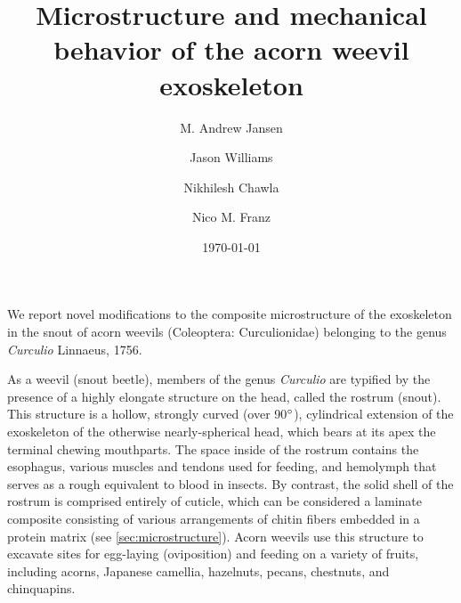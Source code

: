 \documentclass[twocolumn, linenumbers, superscriptaddress]{revtex4-1}
\begin{document}
	\begin{abstract}
		\blindtext
	\end{abstract}
	
	{\title{Microstructure and mechanical behavior of the acorn weevil exoskeleton}
	
	\date{\today}
	
	\author{M. Andrew Jansen}
	\author{Jason Williams}
	\author{Nikhilesh Chawla}
	\author{Nico M. Franz}
		
	\maketitle
	}
	


	We report novel modifications to the composite microstructure of the exoskeleton in the snout of acorn weevils (Coleoptera: Curculionidae) belonging to the genus \textit{Curculio} Linnaeus, 1756.

	As a weevil (snout beetle), members of the genus \textit{Curculio} are typified by the presence of a highly elongate structure on the head, called the rostrum (snout). 
	This structure is a hollow, strongly curved (over 90$\degree$), cylindrical extension of the exoskeleton of the otherwise nearly-spherical head, which bears at its apex the terminal chewing mouthparts. 
	The space inside of the rostrum contains the esophagus, various muscles and tendons used for feeding, and hemolymph that serves as a rough equivalent to blood in insects.
	By contrast, the solid shell of the rostrum is comprised entirely of cuticle, which can be considered a laminate composite consisting of various arrangements of chitin fibers embedded in a protein matrix (see \cref{sec:microstructure}).
	Acorn weevils use this structure to excavate sites for egg-laying (oviposition) and feeding on a variety of fruits, including acorns, Japanese camellia, hazelnuts, pecans, chestnuts, and chinquapins. 
		
\end{document}
